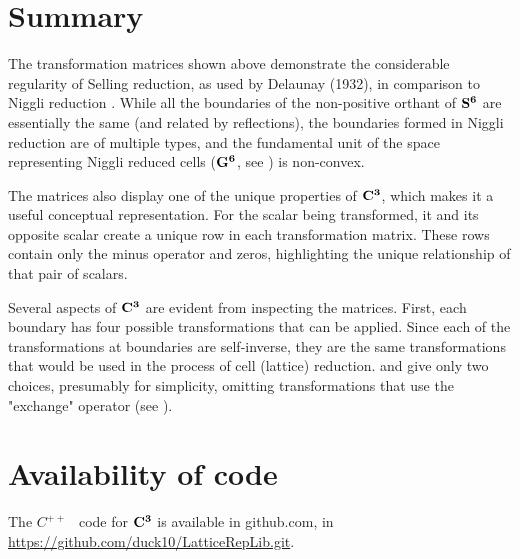 \documentclass[preprint]{iucr}              %
\numberwithin{equation}{section}
\newcommand{\SVI}[0]{$\bf{S^{6}}$}
\newcommand{\GVI}[0]{$\bf{G^{6}}$}
\newcommand{\CIII}[0]{$\bf{C^{3}}$}
\begin{document}
	
	
	
	
	
	
	\section{Summary}
	
The transformation matrices shown above demonstrate the 
considerable regularity of Selling reduction, as used by 
Delaunay (1932), in comparison to Niggli 
reduction \cite{Niggli1928}. While all the boundaries of the non-positive 
orthant of \SVI{} are essentially the same (and 
related by reflections), the boundaries formed in 
Niggli reduction are of multiple types, and the fundamental unit 
of the space representing Niggli reduced cells (\GVI{}, see ) is non-convex.

The matrices also display one of the unique properties of \CIII{}, 
which makes it a useful conceptual representation. 
For the scalar being transformed, it and its opposite scalar
create a unique row in each transformation matrix. These rows contain only
the minus operator and zeros, highlighting the 
unique relationship of that pair of scalars.

Several aspects of \CIII{} are evident from inspecting the matrices. 
First, each boundary has four possible 
transformations that can be applied. Since each of 
the transformations at boundaries are self-inverse, they are the 
same transformations that would be used in the process of 
cell (lattice) reduction.  and  give only two choices, presumably for simplicity, 
omitting transformations that use the "exchange" operator 
(see ).

	
	
	
	
	
	\section{Availability of code}
	
	The $C^{++}$ ~code for \CIII{} is available in github.com, in
	\url{https://github.com/duck10/LatticeRepLib.git}.
	
\end{document}
